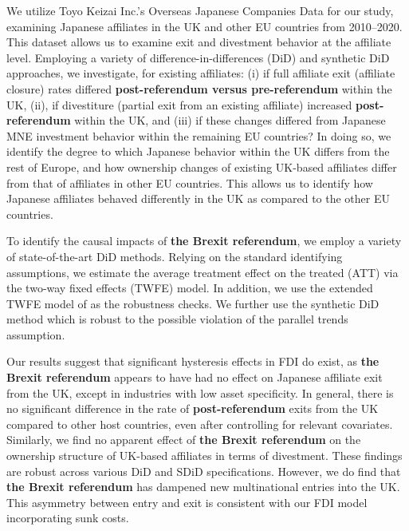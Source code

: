 \documentclass[preprint,11pt,authoryear]{elsarticle}
\begin{document}
We utilize Toyo Keizai Inc.’s Overseas Japanese Companies Data for our study, examining Japanese affiliates in the UK and other EU countries from 2010--2020. This dataset allows us to examine exit and divestment behavior at the affiliate level. Employing a variety of difference-in-differences (DiD) and synthetic DiD approaches, we investigate, for existing affiliates: (i) if full affiliate exit (affiliate closure) rates differed \textbf{post-referendum versus pre-referendum} within the UK, (ii), if divestiture (partial exit from an existing affiliate) increased \textbf{post-referendum} within the UK, and (iii) if these changes differed from Japanese MNE investment behavior within the remaining EU countries? In doing so, we identify the degree to which Japanese behavior within the UK differs from the rest of Europe, and how ownership changes of existing UK-based affiliates differ from that of affiliates in other EU countries. 
This allows us to identify how Japanese affiliates behaved differently in the UK as compared to the other EU countries.


To identify the causal impacts of \textbf{the Brexit referendum}, we employ a variety of state-of-the-art DiD methods. 
Relying on the standard identifying assumptions, we estimate the average treatment effect on the treated (ATT) via the two-way fixed effects (TWFE) model.
In addition, we use the extended TWFE model of \cite{wooldridge2021two} as the robustness checks.
We further use the synthetic DiD method which is robust to the possible violation of the parallel trends assumption.


Our results suggest that significant hysteresis effects in FDI do exist, as \textbf{the Brexit referendum} appears to have had no effect on Japanese affiliate exit from the UK, except in industries with low asset specificity. In general, there is no significant difference in the rate of \textbf{post-referendum} exits from the UK compared to other host countries, even after controlling for relevant covariates. Similarly, we find no apparent effect of \textbf{the Brexit referendum} on the ownership structure of UK-based affiliates in terms of divestment. These findings are robust across various DiD and SDiD specifications. However, we do find that \textbf{the Brexit referendum} has dampened new multinational entries into the UK. This asymmetry between entry and exit is consistent with our FDI model incorporating sunk costs.
\end{document}
